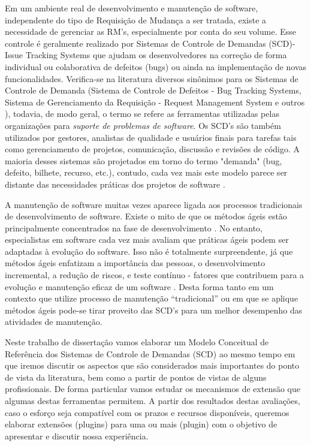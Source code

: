 \documentclass[msc,proposal,hidelot,hideabstract]{ppgccufmg} %
\begin{document}
Em um ambiente real de desenvolvimento e manutenção de software, independente do tipo
de Requisição de Mudança a ser tratada, existe a necessidade de
gerenciar as RM's, especialmente por conta do seu volume. Esse controle é geralmente realizado
por Sistemas de Controle de Demandas (SCD)- Issue Tracking Systems  que ajudam
os desenvolvedores na correção de forma individual ou colaborativa de defeitos (bugs) ou
ainda na implementação de novas funcionalidades. Verifica-se na literatura diversos
sinônimos para os Sistemas de Controle de Demanda (Sistema de Controle de
Defeitos - Bug Tracking Systems, Sistema de Gerenciamento da Requisição -
Request Management System e outros ), todavia, de modo geral, o
termo se refere as ferramentas utilizadas pelas organizações para \textit{suporte de problemas de software}. Os SCD's são também utilizados por gestores, analistas de qualidade e usuários finais para
tarefas tais como gerenciamento de projetos, comunicação, discussão e revisões
de código. A maioria desses sistemas são projetados em torno do termo "demanda"
(bug, defeito, bilhete, recurso, etc.), contudo, cada vez mais este modelo parece
ser distante das necessidades práticas dos projetos de software
\cite{Baysal:2013:SAP:2486788.2486957}.

A manutenção de software muitas vezes aparece ligada aos processos tradicionais
de desenvolvimento de software. Existe o mito de que os métodos ágeis estão
principalmente concentrados na fase de desenvolvimento
\cite{kajko2009model}. No entanto, especialistas em software cada vez mais
avaliam que práticas ágeis podem ser adaptadas à evolução do software. Isso não
é totalmente surpreendente, já que métodos ágeis enfatizam a importância das
pessoas, o desenvolvimento incremental, a redução de riscos, e teste contínuo -
fatores que contribuem para a evolução e manutenção  eficaz de um software
\cite{thomas2006agile}. Desta forma tanto em um contexto que utilize processo de manutenção
``tradicional'' ou em que se aplique métodos ágeis pode-se tirar proveito das
SCD's para um melhor desempenho das atividades de manutenção.

Neste trabalho de dissertação vamos elaborar um Modelo Conceitual de Referência
dos Sistemas de Controle de Demandas (SCD) ao mesmo tempo em que iremos discutir os aspectos que
são considerados mais importantes do ponto de vista da literatura, bem como a partir de pontos de vistas de alguns
profissionais. De forma particular vamos estudar os mecanismos de
extensão que algumas destas ferramentas permitem. A partir dos resultados destas avaliações, caso o esforço seja
compatível com os prazos e recursos disponíveis, queremos elaborar extensões (plugins)
para uma ou mais (plugin) com o objetivo de apresentar e discutir nossa experiência.
\end{document}
